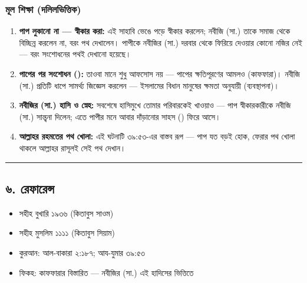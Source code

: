 \subsubsection*{মূল শিক্ষা (দলিলভিত্তিক)}

\begin{enumerate}
\item \textbf{পাপ লুকানো না — স্বীকার করা:} এই সাহাবি ভেঙে পড়ে স্বীকার করলেন; নবীজি (সা.) তাকে সমাজ থেকে বিচ্ছিন্ন করলেন না, বরং পথ দেখালেন। পাপীকে নবীজির (সা.) দরবার থেকে ফিরিয়ে দেওয়ার কোনো নজির নেই — বরং সংশোধনের পথই দেখানো হয়েছে।
\item \textbf{পাপের পর সংশোধন ():} তাওবা মানে শুধু আফসোস নয় — পাপের ক্ষতিপূরণের আমলও (কাফফারা)। নবীজি (সা.) প্রতিটি ধাপে সামর্থ্য জিজ্ঞেস করলেন — ইসলামের বিধান মানুষের ক্ষমতা অনুযায়ী (ব্যবস্থাপনা)।
\item \textbf{নবীজির (সা.) হাসি ও স্নেহ:} সবশেষে হাসিমুখে তোমার পরিবারকেই খাওয়াও — পাপ স্বীকারকারীকে নবীজি (সা.) সান্ত্বনা দিলেন; এতে পাপীর মনে আবার দাঁড়ানোর সাহস () ফিরে আসে।
\item \textbf{আল্লাহর রহমতের পথ খোলা:} এই ঘটনাটি ৩৯:৫৩-এর বাস্তব রূপ — পাপ যত বড়ই হোক, ফেরার পথ খোলা থাকলে আল্লাহর রাসূলই সেই পথ দেখান।
\end{enumerate}
\medskip\hrule\medskip

\subsection*{৬. রেফারেন্স}

\begin{itemize}
\item সহীহ বুখারি ১৯৩৬ (কিতাবুস সাওম)
\item সহীহ মুসলিম ১১১১ (কিতাবুস সিয়াম)
\item কুরআন: আল-বাকারা ২:১৮৭; আয-যুমার ৩৯:৫৩
\item ফিকহ: কাফফারার বিস্তারিত — নবীজির (সা.) এই হাদিসের ভিত্তিতে
\end{itemize}


